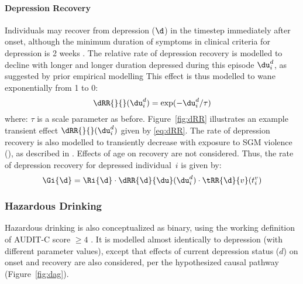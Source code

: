 \paragraph{Depression Recovery}
Individuals may recover from depression ($\d$)
in the timestep immediately after onset,
although the minimum duration of symptoms
in clinical criteria for depression is 2 weeks \cite{APA2013}.
The relative rate of depression recovery is modelled to decline
with longer and longer duration depressed during this episode $\du^d_i$,
as suggested by prior empirical modelling \cite{Patten2005}
This effect is thus modelled to wane exponentially from 1 to 0:
\begin{equation}\label{eq:dRR}
  \dRR{}{}(\du^d_i) = \exp(-\du^d_i/\tau)
\end{equation}
where: $\tau$ is a scale parameter as before.
Figure~\ref{fig:dRR} illustrates
an example transient effect $\dRR{}{}(\du^d_i)$ given by \eqref{eq:dRR}.
The rate of depression recovery is also modelled to
transiently decrease with exposure to SGM violence (),
as described in .
Effects of age on recovery are not considered.
Thus, the rate of depression recovery for depressed individual~$i$ is given by:
\begin{equation}
  \Gi{\d} = \Ri{\d}
    \cdot \dRR{\d}{\du}(\du^d_i)
    \cdot \tRR{\d}{v}(t^v_i)
\end{equation}
\subsubsection{Hazardous Drinking}\label{mod.par.evt.haz}
Hazardous drinking is also conceptualized as binary,
using the working definition of AUDIT-C score $\ge 4$ \cite{Bush1998}.
It is modelled almost identically to depression
(with different parameter values),
except that effects of current depression status ($d$)
on \hazdrink onset and recovery are also considered,
per the hypothesized causal pathway (Figure~\ref{fig:dag}).
